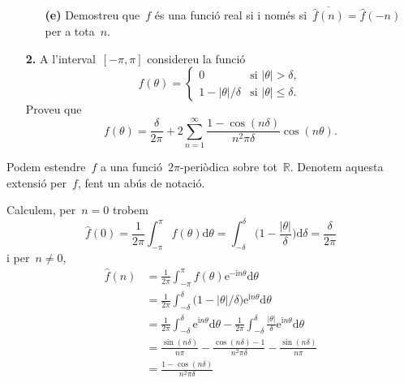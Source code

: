 \documentclass[a4paper]{article}
\newcommand{\iu}{\mathrm{i}}
\newcommand{\e}{\mathrm{e}}
\providecommand{\uppi}{\pi}
\newcommand{\diff}{\mathrm{d}}
\newcommand{\abs}[1]{\lvert{#1}\rvert}
\newcommand{\conjugat}[1]{\overline{#1}}
\begin{document}
\begin{enumerate}
    \item[]\begin{enumerate}
        \item[\textbf{(e)}] Demostreu que~\(f\) és una funció real si i només
            si~\(\conjugat{\widehat{f}(n)} = \widehat{f}(-n)\) per a tota~\(n\).
    \end{enumerate}
\end{enumerate}

\clearpage
\begin{enumerate}
    \item[\textbf{2.}] A l'interval~\([-\uppi, \uppi]\) considereu la funció
        \[
            f(\theta) =
            \begin{cases}
                0 & \text{si } \abs{\theta} > \delta, \\
                1 - \abs{\theta}/\delta & \text{si } \abs{\theta} \leq \delta.
            \end{cases}
        \]
        Proveu que
        \[
            f(\theta) = \frac{\delta}{2\uppi}
            + 2 \sum_{n = 1}^{\infty}
            \frac{1-\cos(n\delta)}{n^{2}\uppi\delta} \cos(n\theta).
        \]
\end{enumerate}
Podem estendre~\(f\) a una funció~\(2\uppi\)-periòdica sobre
tot~\(\mathbb{R}\).
Denotem aquesta extensió per~\(f\), fent un abús de notació.

Calculem, per~\(n = 0\) trobem
\[
    \widehat{f}(0) = \frac{1}{2\uppi}
                     \int_{-\uppi}^{\uppi}f(\theta)\diff\theta
                   = \int_{-\delta}^{\delta}
                     \biggl(1 - \frac{\abs{\theta}}{\delta}\biggr)
                     \diff\delta
                   = \frac{\delta}{2\uppi}
\]
i per~\(n \neq 0\),
\begin{align*}
    \widehat{f}(n) &= \frac{1}{2\uppi} \int_{-\uppi}^{\uppi}
                      f(\theta) \e^{-\iu n\theta}
                      \diff \theta \\
                   &= \frac{1}{2\uppi} \int_{-\delta}^{\delta}
                      \bigl(1 - \abs{\theta}/\delta\bigr)
                      \e^{\iu n\theta}
                      \diff \theta \\
                   &= \frac{1}{2\uppi} \int_{-\delta}^{\delta}
                      \e^{\iu n\theta}
                      \diff \theta
                      - \frac{1}{2\uppi} \int_{-\delta}^{\delta}
                      \frac{\abs{\theta}}{\delta} \e^{\iu n\theta}
                      \diff \theta \\
                   &= \frac{\sin(n\delta)}{n\uppi}
                      - \frac{\cos(n\delta) - 1}{n^{2}\uppi\delta}
                      - \frac{\sin(n\delta)}{n\uppi} \\
                   &= \frac{1 - \cos(n\delta)}{n^{2}\uppi\delta}
\end{align*}
\end{document}
